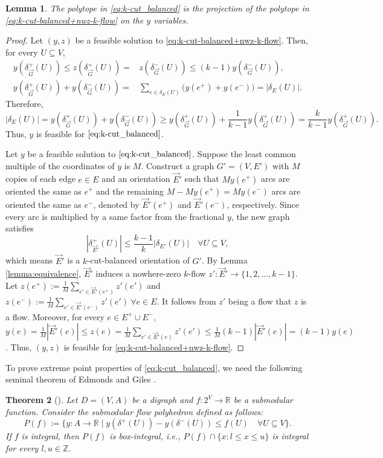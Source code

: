 \documentclass[11pt]{article}
\newtheorem{theorem}{Theorem}
\newtheorem{lemma}[theorem]{Lemma}
\newcommand{\Z}{\mathbb{Z}}
\newcommand{\R}{\mathbb{R}}
\begin{document}
\begin{lemma}\label{lemma:proj-y}
    The polytope in \eqref{eq:k-cut_balanced} is the projection of the polytope in \eqref{eq:k-cut-balanced+nwz-k-flow} on the $y$ variables.
\end{lemma}
\begin{proof}
    Let $(y,z)$ be a feasible solution to \eqref{eq:k-cut-balanced+nwz-k-flow}. Then, for every $U\subseteq V$,
    \[
    \begin{aligned}
        y(\delta_{\vec{G}}^+(U))\leq z(\delta_{\vec{G}}^+(U))=&z(\delta_{\vec{G}}^-(U))\leq (k-1)y(\delta_{\vec{G}}^-(U)),\\
        y(\delta_{\vec{G}}^+(U))+y(\delta_{\vec{G}}^-(U))=&\sum_{e\in \delta_E(U)}\big(y(e^+)+y(e^-)\big)=|\delta_E(U)|.
    \end{aligned}
    \]
    Therefore, \[|\delta_E(U)|=y(\delta_{\vec{G}}^+(U))+y(\delta_{\vec{G}}^-(U))\geq y(\delta_{\vec{G}}^+(U))+\frac{1}{k-1}y(\delta_{\vec{G}}^+(U))=\frac{k}{k-1}y(\delta_{\vec{G}}^+(U)).\]
    Thus, $y$ is feasible for $\eqref{eq:k-cut_balanced}$.

    Let $y$ be a feasible solution to $\eqref{eq:k-cut_balanced}$. Suppose the least common multiple of the coordinates of $y$ is $M$. Construct a graph $G'=(V,E')$ with $M$ copies of each edge $e\in E$ and an orientation $\vec{E}'$ such that $My(e^+)$ arcs are oriented the same as $e^+$ and the remaining $M-My(e^+)=My(e^-)$ arcs are oriented the same as $e^-$, denoted by $\vec{E}'(e^+)$ and $\vec{E}'(e^-)$, respectively. Since every arc is multiplied by a same factor from the fractional $y$, the new graph satisfies
    \[
    |\delta_{\vec{E}'}^+(U)|\leq \frac{k-1}{k}|\delta_{E'}(U)|\quad \forall U\subseteq V,
    \]
    which means $\vec{E}'$ is a $k$-cut-balanced orientation of $G'$. By Lemma \ref{lemma:equivalence}, $\vec{E}'$ induces a nowhere-zero $k$-flow $z':\vec{E}'\rightarrow \{1,2,...,k-1\}$. Let $z(e^+):=\frac{1}{M}\sum_{e'\in \vec{E}'(e^+)} z'(e')$ and $z(e^-):=\frac{1}{M}\sum_{e'\in \vec{E}'(e^-)} z'(e')\ \forall e\in E$. It follows from $z'$ being a flow that $z$ is a flow. Moreover, for every $e\in E^+\cup E^-$, $y(e)=\frac{1}{M} |\vec{E}'(e)|\leq z(e)=\frac{1}{M}\sum_{e'\in \vec{E}'(e)} z'(e')\leq \frac{1}{M}(k-1) |\vec{E}'(e)|=(k-1)y(e)$. Thus, $(y,z)$ is feasible for \eqref{eq:k-cut-balanced+nwz-k-flow}.
\end{proof}
To prove extreme point properties of \eqref{eq:k-cut_balanced}, we need the following seminal theorem of Edmonds and Giles \cite{edmonds1977min}.
\begin{theorem}[\cite{edmonds1977min}]\label{thm:submodular_flow}
    Let $D=(V,A)$ be a digraph and $f:2^V\rightarrow \R$ be a submodular function. Consider the \emph{submodular flow} polyhedron defined as follows:
    \[
P(f):=\big\{y: A\rightarrow \R \mid y(\delta^+(U))-y(\delta^-(U))\leq f(U)\quad \forall U\subseteq V\big\}.
\]
If $f$ is integral, then $P(f)$ is  \emph{box-integral}, i.e., $P(f)\cap \{x: l\leq x\leq u\}$ is integral for every $l,u\in \Z$. 
\end{theorem}
\end{document}
